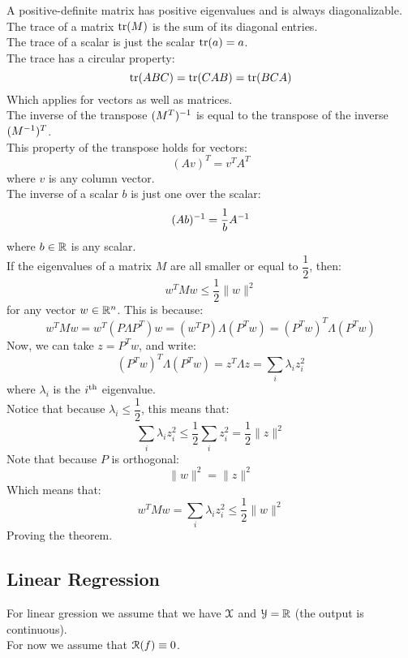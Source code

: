 \documentclass[12pt]{article}
\begin{document}
A positive-definite matrix has positive
eigenvalues and is always diagonalizable. \\

The trace of a matrix $\text{tr}(M)$ is the sum of its
diagonal entries. \\

The trace of a scalar is just the scalar
$\text{tr}(a) = a$. \\

The trace has a circular property:
\[ \text{tr}(ABC) = \text{tr}(CAB) = \text{tr}(BCA) \]
Which applies for vectors as well as matrices. \\

The inverse of the transpose $(M^T)^{-1}$
is equal to the transpose of the inverse 
$(M^{-1})^T$. \\

This property of the transpose holds for vectors:
\[ (Av)^T = v^TA^T \]
where $v$ is any column vector. \\

The inverse of a scalar $b$ 
is just one over the scalar:
\[ (Ab)^{-1} = \dfrac{1}{b}A^{-1} \]
where $b \in \mathbb{R}$ is any scalar. \\

If the eigenvalues of a matrix $M$
are all smaller or equal to $\dfrac{1}{2}$,
then:
\[ w^TMw \leq \dfrac{1}{2} \|w\|^2 \]
for any vector $w \in \mathbb{R}^n$.
This is because:
\[ w^TMw = w^T(P\Lambda P^T)w
= (w^TP)\Lambda(P^Tw)
= (P^Tw)^T\Lambda(P^Tw) \]
Now, we can take $z = P^Tw$, and write:
\[ (P^Tw)^T\Lambda(P^Tw) 
= z^T \Lambda z = \sum_i \lambda_i z_i^2 \]
where $\lambda_i$ is the $i^{\text{th}}$ eigenvalue. \\
Notice that because $\lambda_i \leq \dfrac{1}{2}$,
this means that:
\[\sum_i \lambda_i z_i^2 
\leq \dfrac{1}{2} \sum_i z_i^2 = \dfrac{1}{2} \|z\|^2 \]
Note that because $P$ is orthogonal:
\[ \|w\|^2 = \|z\|^2 \]
Which means that:
\[w^TMw = \sum_i \lambda_i z_i^2 
\leq \dfrac{1}{2} \|w\|^2\]
Proving the theorem. \\

\newpage

\subsection*{Linear Regression}

For linear gression we assume that
we have $\mathcal{X}$ and $\mathcal{Y} = \mathbb{R}$
(the output is continuous). \\

For now we assume that $\mathcal{R}(f) \equiv 0$. \\
\end{document}
